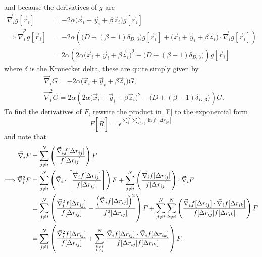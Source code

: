 \documentclass[a4paper,8pt]{article}
\begin{document}
and because the derivatives of $g$ are
\begin{align}
\vec{\nabla}_i g[\vec{r}_i] &= -2\alpha\Big(\vec{x}_i+\vec{y}_i+\beta\vec{z}_i\Big)g[\vec{r}_i] \\
\Longrightarrow \vec{\nabla}_i^2 g[\vec{r}_i] &= -2\alpha\left(\Big(D+(\beta-1)\delta_{D,3}\Big)g[\vec{r}_i]+\Big(\vec{x}_i+\vec{y}_i+\beta\vec{z}_i\Big)\cdot\vec{\nabla}_i g[\vec{r}_i]\right) \nonumber\\
&= 2\alpha\left(2\alpha\Big(\vec{x}_i+\vec{y}_i+\beta\vec{z}_i\Big)^2-\Big(D+(\beta-1)\delta_{D,3}\Big)\right)g[\vec{r}_i]
\end{align}
where $\delta$ is the Kronecker delta, these are quite simply given by
\begin{align}
&\vec{\nabla}_i G = -2\alpha\Big(\vec{x}_i+\vec{y}_i+\beta\vec{z}_i\Big)G, \label{grad_G}\\
&\vec{\nabla}_i^2G = 2\alpha\left(2\alpha\Big(\vec{x}_i+\vec{y}_i+\beta\vec{z}_i\Big)^2-\Big(D+(\beta-1)\delta_{D,3}\Big)\right)G. \label{Lap_G}
\end{align}
To find the derivatives of $F$, rewrite the product in \eqref{F} to the exponential form 
\begin{equation}
F[\vec{R}] = \epsilon^{\sum\limits_{j}^N\sum\limits_{k > j}^N \ln f[\Delta{r}_{jk}]}
\end{equation}
and note that
\begin{align}
\vec{\nabla}_i F &= \sum\limits_{j \neq i}^N \left(\frac{\vec{\nabla}_i f[\Delta{r}_{ij}]}{f[\Delta{r}_{ij}]}\right) F \nonumber\\
\Longrightarrow \vec{\nabla}_i^2 F &= \sum\limits_{j \neq i}^N \left(\vec{\nabla}_i\cdot\left[\frac{\vec{\nabla}_i f[\Delta{r}_{ij}]}{f[\Delta{r}_{ij}]}\right]\right) F + \sum\limits_{j \neq i}^N \left(\frac{\vec{\nabla}_i f[\Delta{r}_{ij}]}{f[\Delta{r}_{ij}]}\right)\cdot \vec{\nabla}_i F \nonumber\\
&= \sum\limits_{j \neq i}^N \left(\frac{\vec{\nabla}_i^2 f[\Delta{r}_{ij}]}{f[\Delta{r}_{ij}]} - \frac{\left(\vec{\nabla}_i f[\Delta{r}_{ij}]\right)^2}{f^2[\Delta{r}_{ij}]}\right) F + \sum\limits_{j \neq i}^N \sum\limits_{k \neq i}^N \left(\frac{\vec{\nabla}_i f[\Delta{r}_{ij}] \cdot\vec{\nabla}_i f[\Delta{r}_{ik}]}{f[\Delta{r}_{ij}]f[\Delta{r}_{ik}]}\right) F \nonumber\\
&= \sum\limits_{j \neq i}^N \left(\frac{\vec{\nabla}_i^2 f[\Delta{r}_{ij}]}{f[\Delta{r}_{ij}]} + \sum\limits_{{k \neq i}\atop{k \neq j}}^N \frac{\vec{\nabla}_i f[\Delta{r}_{ij}] \cdot\vec{\nabla}_i f[\Delta{r}_{ik}]}{f[\Delta{r}_{ij}]f[\Delta{r}_{ik}]}\right) F. \nonumber
\end{align}
\end{document}
